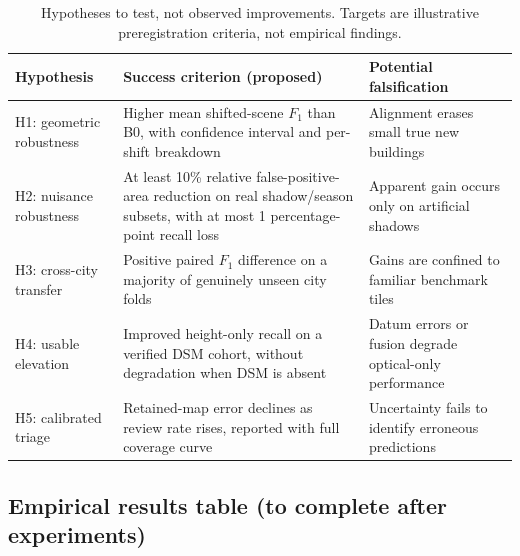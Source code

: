 \documentclass[11pt,a4paper]{article}
\newcommand{\tabhead}[1]{\textbf{#1}}
\begin{document}
\begin{table}[htbp]
\centering\footnotesize
\caption{Hypotheses to test, not observed improvements. Targets are illustrative preregistration criteria, not empirical findings.}
\label{tab:hypotheses}
\begin{tabular}{@{}>{\raggedright\arraybackslash}p{}>{\raggedright\arraybackslash}p{}>{\raggedright\arraybackslash}p{}@{}}
\toprule
\tabhead{Hypothesis} & \tabhead{Success criterion (proposed)} & \tabhead{Potential falsification}\\
\midrule
H1: geometric robustness & Higher mean shifted-scene $F_1$ than B0, with confidence interval and per-shift breakdown & Alignment erases small true new buildings\\
H2: nuisance robustness & At least 10\% relative false-positive-area reduction on real shadow/season subsets, with at most 1 percentage-point recall loss & Apparent gain occurs only on artificial shadows\\
H3: cross-city transfer & Positive paired $F_1$ difference on a majority of genuinely unseen city folds & Gains are confined to familiar benchmark tiles\\
H4: usable elevation & Improved height-only recall on a verified DSM cohort, without degradation when DSM is absent & Datum errors or fusion degrade optical-only performance\\
H5: calibrated triage & Retained-map error declines as review rate rises, reported with full coverage curve & Uncertainty fails to identify erroneous predictions\\
\bottomrule
\end{tabular}
\end{table}

\subsection{Empirical results table (to complete after experiments)}
\end{document}
